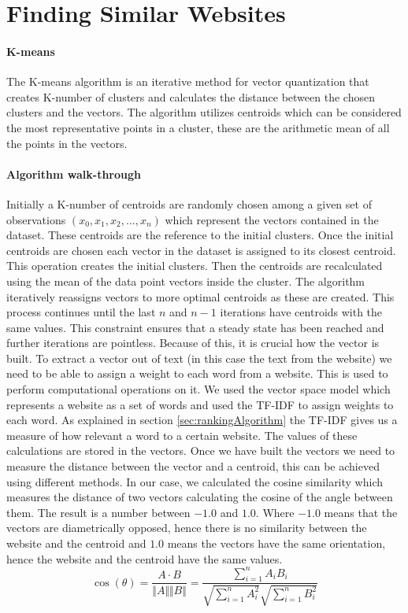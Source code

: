 \section{Finding Similar Websites}
\paragraph{K-means}
The K-means algorithm is an iterative method for vector quantization that creates K-number of clusters and calculates the distance between the chosen clusters and the vectors. 
The algorithm utilizes centroids which can be considered the most representative points in a cluster, these are the arithmetic mean of all the points in the vectors.
\paragraph{Algorithm walk-through}
Initially a K-number of centroids are randomly chosen among a given set of observations $(x_0,x_1,x_2,...,x_n)$ which represent the vectors contained in the dataset. These centroids are the reference to the initial clusters. Once the initial centroids are chosen each vector in the dataset is assigned to its closest centroid. This operation creates the initial clusters. Then the centroids are recalculated using the mean of the data point vectors inside the cluster. 
The algorithm iteratively reassigns vectors to more optimal centroids as these are created.\cite{wikiKmeans}
This process continues until the last $n$ and $n-1$ iterations have centroids with the same values. 
This constraint ensures that a steady state has been reached and further iterations are pointless.
Because of this, it is crucial how the vector is built. To extract a vector out of text (in this case the text from the website) we need to be able to assign a weight to each word from a website. This is used to perform computational operations on it. We used the vector space model which represents a website as a set of words and used the TF-IDF to assign weights to each word. As explained in section \ref{sec:rankingAlgorithm} the TF-IDF gives us a measure of how  relevant a word to a certain website. The values of these calculations are stored in the vectors.
Once we have built the vectors we need to measure the distance between the vector and a centroid, this can be achieved using different methods. In our case, we calculated the cosine similarity which measures the distance of two vectors calculating the cosine of the angle between them. The result is a number between $-1.0$ and $1.0$. Where $-1.0$ means that the vectors are diametrically opposed, hence there is no similarity between the website and the centroid and $1.0$ means the vectors have the same orientation, hence the website and the centroid have the same values.\cite{wikiVector}
$$
\cos(\theta) = \frac{A \cdot B}{\Vert A \Vert \Vert B \Vert} = \frac{\sum_{i=1}^n A_iB_i}{\sqrt{\sum_{i=1}^n A_i^2}{\sqrt{\sum_{i=1}^n B_i^2}}}
$$

